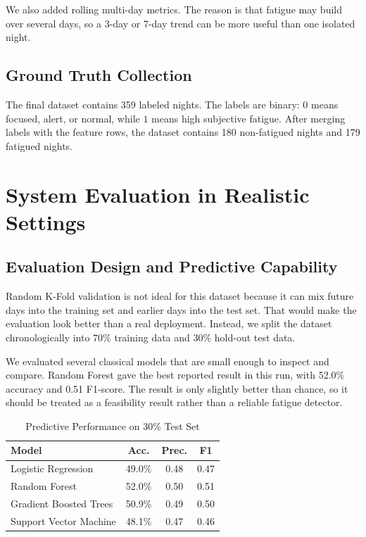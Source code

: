 \documentclass[sigconf,10pt]{acmart}
\begin{document}
We also added rolling multi-day metrics. The reason is that fatigue may build over several days, so a 3-day or 7-day trend can be more useful than one isolated night.

\subsection{Ground Truth Collection}
The final dataset contains 359 labeled nights. The labels are binary: $0$ means focused, alert, or normal, while $1$ means high subjective fatigue. After merging labels with the feature rows, the dataset contains 180 non-fatigued nights and 179 fatigued nights.

\section{System Evaluation in Realistic Settings}

\subsection{Evaluation Design and Predictive Capability}
Random K-Fold validation is not ideal for this dataset because it can mix future days into the training set and earlier days into the test set. That would make the evaluation look better than a real deployment. Instead, we split the dataset chronologically into 70\% training data and 30\% hold-out test data.

We evaluated several classical models that are small enough to inspect and compare. Random Forest gave the best reported result in this run, with 52.0\% accuracy and 0.51 F1-score. The result is only slightly better than chance, so it should be treated as a feasibility result rather than a reliable fatigue detector.

\begin{table}[t]
  \caption{Predictive Performance on 30\% Test Set}
  \label{tab:results}
  \centering
  \small
  \setlength{\tabcolsep}{4pt}
  \begin{tabular}{lccc}
    \toprule
    Model & Acc. & Prec. & F1\\
    \midrule
    Logistic Regression & 49.0\% & 0.48 & 0.47 \\
    Random Forest & 52.0\% & 0.50 & 0.51 \\
    Gradient Boosted Trees & 50.9\% & 0.49 & 0.50 \\
    Support Vector Machine & 48.1\% & 0.47 & 0.46 \\
    \bottomrule
  \end{tabular}
\end{table}
\end{document}
